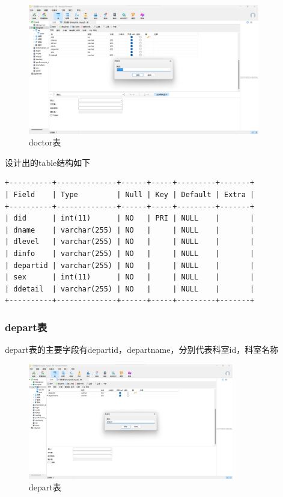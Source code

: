 \documentclass[UTF8,12pt]{article}
\begin{document}
\begin{figure}[htbp]
    \centering
    \includegraphics[width=0.9\textwidth]{imgs/6.png}
    \caption{doctor表}
\end{figure}

设计出的table结构如下

\begin{lstlisting}[frame=shadowbox]
+----------+--------------+------+-----+---------+-------+
| Field    | Type         | Null | Key | Default | Extra |
+----------+--------------+------+-----+---------+-------+
| did      | int(11)      | NO   | PRI | NULL    |       |
| dname    | varchar(255) | NO   |     | NULL    |       |
| dlevel   | varchar(255) | NO   |     | NULL    |       |
| dinfo    | varchar(255) | NO   |     | NULL    |       |
| departid | varchar(255) | NO   |     | NULL    |       |
| sex      | int(11)      | NO   |     | NULL    |       |
| ddetail  | varchar(255) | NO   |     | NULL    |       |
+----------+--------------+------+-----+---------+-------+
\end{lstlisting}

\subsubsection{depart表}

depart表的主要字段有departid，departname，分别代表科室id，科室名称

\begin{figure}[htbp]
    \centering
    \includegraphics[width=0.8\textwidth]{imgs/7.png}
    \caption{depart表}
\end{figure}
\end{document}
